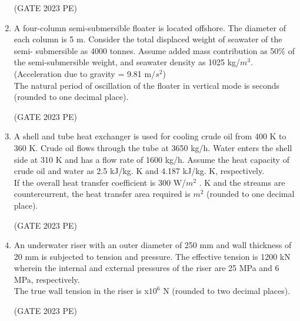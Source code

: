 \documentclass[journal,12pt,onecolumn]{exam}
\theoremstyle{remark}
\begin{document}
\begin{enumerate}
\hfill{(GATE 2023 PE)}
\item A four-column semi-submersible floater is located offshore. The diameter of each
column is 5 m. Consider the total displaced weight of seawater of the semi-
submersible as 4000 tonnes. Assume added mass contribution as 50\% of the semi-submersible weight, and seawater density as 1025 kg/$m^3$.\\
(Acceleration due to gravity = 9.81 m/$s^2$)\\
The natural period of oscillation of the floater in vertical mode is  \underline{\hspace{2cm}}
seconds (rounded to one decimal place).

\hfill{(GATE 2023 PE)}
\item A shell and tube heat exchanger is used for cooling crude oil from 400 K to 360 K.
Crude oil flows through the tube at 3650 kg/h. Water enters the shell side at 310 K
and has a flow rate of 1600 kg/h. Assume the heat capacity of crude oil and water as 2.5 kJ/kg. K and 4.187 kJ/kg. K, respectively.\\
If the overall heat transfer coefficient is 300 W/$m^2$ . K and the streams are countercurrent, the heat transfer area required is\underline{\hspace{2cm}} $m^2$ (rounded to one decimal place).

\hfill{(GATE 2023 PE)}
\item An underwater riser with an outer diameter of 250 mm and wall thickness of
20 mm is subjected to tension and pressure. The effective tension is 1200 kN
wherein the internal and external pressures of the riser are 25 MPa and 6 MPa, respectively.\\
The true wall tension in the riser is \underline{\hspace{2cm}} x$10^6$ N (rounded to two decimal places).

\hfill{(GATE 2023 PE)}















\end{enumerate}
\end{document}
